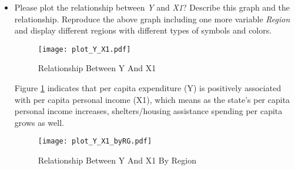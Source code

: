 \documentclass[12pt,letterpaper]{article}
\begin{document}
\begin{itemize}
		
		\item
		Please plot the relationship between \emph{Y} and \emph{X1}? Describe this graph and the relationship. Reproduce the above graph including one more variable \emph{Region} and display different regions with different types of symbols and colors.
		
		
		

		\begin{figure}[H]
			\centering
			\texttt{[image: plot\_Y\_X1.pdf]}
			\caption{\footnotesize Relationship Between Y And X1}
			\label{fig:plot_3}
		\end{figure}
		
		Figure \ref{fig:plot_3} indicates that per capita expenditure (Y) is positively associated with per capita personal income (X1), which means as the state's per capita personal income increases, shelters/housing assistance spending per capita grows as well.
		
		\vspace{1cm}
		
		
		
		\begin{figure}[H]
			\centering
			\texttt{[image: plot\_Y\_X1\_byRG.pdf]}
			\caption{\footnotesize Relationship Between Y And X1 By Region}
			\label{fig:plot_4}
		\end{figure}
		
		
	
		
	\end{itemize}
	
\end{document}
